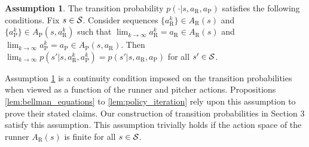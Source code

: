 \documentclass[aoas]{imsart}
\theoremstyle{plain}
\theoremstyle{definition}
\newtheorem{assumption}[theorem]{Assumption}
\begin{document}
       \begin{assumption}
           \label{assum:transition_pby_continuous}
           The transition probability $p(\cdot|s,a_\text{R},a_\text{P})$ satisfies the following conditions. Fix $s \in {\cal S}$. Consider sequences $\{a_\text{R}^k\} \in A_\text{R}(s)$ and $\{a_\text{P}^k\} \in A_\text{P}(s,a_\text{R}^k)$ such that $\lim_{k \to \infty}a_\text{R}^k = a_\text{R} \in A_\text{R}(s)$ and  $\lim_{k \to \infty}a_\text{P}^k = a_\text{P} \in A_\text{P}(s,a_\text{R})$. Then $\lim_{k \to \infty}p(s'|s,a_\text{R}^k,a_\text{P}^k) = p(s'|s,a_\text{R},a_\text{P})$ for all $s' \in {\cal S}$.
       \end{assumption}
       \noindent Assumption \ref{assum:transition_pby_continuous} is a continuity condition imposed on the transition probabilities when viewed as a function of the runner and pitcher actions. Propositions  \ref{lem:bellman_equations} to \ref{lem:policy_iteration} rely upon this assumption to prove their stated claims. Our construction of transition probabilities in Section 3 satisfy this assumption. This assumption trivially holds if the action space of the runner $A_\text{R}(s)$ is finite for all $s \in {\cal S}$.
    
\end{document}
